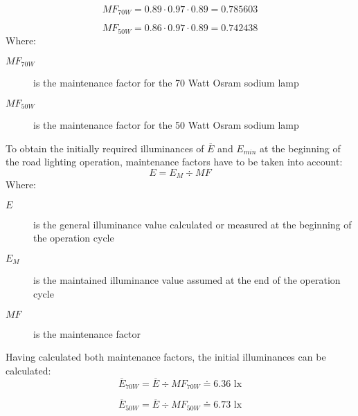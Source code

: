 \begin{equation}
MF_{70W} = 0.89 \cdot 0.97 \cdot 0.89 = 0.785603
\end{equation}

\begin{equation}
MF_{50W} = 0.86 \cdot 0.97 \cdot 0.89 = 0.742438
\end{equation}
Where:
\begin{description}
	\item[$MF_{70W}$] is the maintenance factor for the 70 Watt Osram sodium lamp
	\item[$MF_{50W}$] is the maintenance factor for the 50 Watt Osram sodium lamp
\end{description}

To obtain the initially required illuminances of $\overline{E}$ and $E_{min}$ at the beginning of the road lighting operation, maintenance factors have to be taken into account:
\begin{equation}
E = E_{M} \div MF
\end{equation}
Where:
\begin{description}
	\item[$E$] is the general illuminance value calculated or measured at the beginning of the operation cycle
	\item[$E_{M}$] is the maintained illuminance value assumed at the end of the operation cycle
	\item[$MF$] is the maintenance factor
\end{description}

Having calculated both maintenance factors, the initial illuminances can be calculated:
\begin{equation}
\overline{E}_{70W} = \overline{E} \div MF_{70W} \doteq 6.36 \text{ lx}
\end{equation}

\begin{equation}
\overline{E}_{50W} = \overline{E} \div MF_{50W} \doteq 6.73 \text{ lx}
\end{equation}
